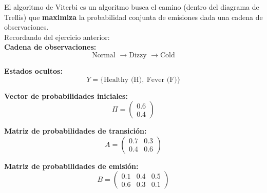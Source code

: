 El algoritmo de Viterbi es un algoritmo busca el camino (dentro del diagrama de Trellis) que \textbf{maximiza} la probabilidad conjunta de emisiones dada una cadena de observaciones.\\

Recordando del ejercicio anterior:\\
\textbf{Cadena de observaciones:}
\[
\text{Normal } \to \text{Dizzy } \to \text{Cold}
\]

\textbf{Estados ocultos:}
\[
Y = \{\text{Healthy (H)},\ \text{Fever (F)}\}
\]

\textbf{Vector de probabilidades iniciales:}
\[
\Pi = \begin{pmatrix} 0.6 \\ 0.4 \end{pmatrix}
\]

\textbf{Matriz de probabilidades de transición:}
\[
A = \begin{pmatrix} 0.7 & 0.3 \\ 0.4 & 0.6 \end{pmatrix}
\]

\textbf{Matriz de probabilidades de emisión:}
\[
B = \begin{pmatrix} 0.1 & 0.4 & 0.5 \\ 0.6 & 0.3 & 0.1 \end{pmatrix}
\]

